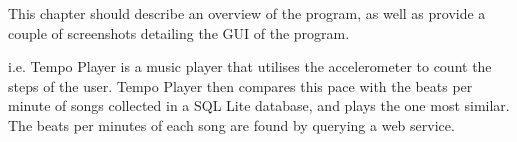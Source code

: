 This chapter should describe an overview of the program, as well as provide a couple of screenshots detailing the GUI of the program.

i.e. Tempo Player is a music player that utilises the accelerometer to count the steps of the user. 
Tempo Player then compares this pace with the beats per minute of songs collected in a SQL Lite database, and plays the one most similar. 
The beats per minutes of each song are found by querying a web service. 

